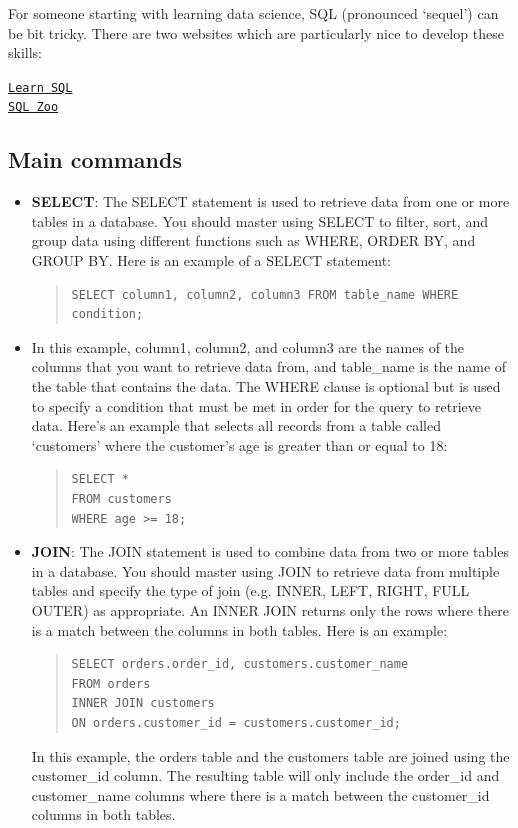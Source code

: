 \documentclass[11pt]{article}
\begin{document}
For someone starting with learning data science, SQL (pronounced `sequel') can be bit tricky. 
There are two websites which are particularly nice to develop these skills:

\href{https://learnsql.com/blog}{\texttt{Learn SQL}}  \\ 
\href{https://sqlzoo.net/wiki/SQL_Tutorial}{\texttt{SQL Zoo}} 

% 


\subsection{Main commands} 

\begin{itemize}
\item \textbf{SELECT}: The SELECT statement is used to retrieve data from one or more tables in a database. You should master using SELECT to filter, sort, and group data using different functions such as WHERE, ORDER BY, and GROUP BY. Here is an example of a SELECT statement:
\begin{quote}
\begin{verbatim}
SELECT column1, column2, column3 FROM table_name WHERE condition; 
\end{verbatim}
\end{quote}
\item In this example, column1, column2, and column3 are the names of the columns that you want to retrieve data from, and table\_name is the name of the table that contains the data. The WHERE clause is optional but is used to specify a condition that must be met in order for the query to retrieve data. Here’s an example that selects all records from a table called `customers' where the customer’s age is greater than or equal to 18:
\begin{quote}
\begin{verbatim}
SELECT * 
FROM customers
WHERE age >= 18;
\end{verbatim}
\end{quote}


\item \textbf{JOIN}: The JOIN statement is used to combine data from two or more tables in a database. You should master using JOIN to retrieve data from multiple tables and specify the type of join (e.g. INNER, LEFT, RIGHT, FULL OUTER) as appropriate.
An INNER JOIN returns only the rows where there is a match between the columns in both tables. Here is an example:
\begin{quote}
\begin{verbatim}
SELECT orders.order_id, customers.customer_name
FROM orders
INNER JOIN customers
ON orders.customer_id = customers.customer_id;
\end{verbatim}
\end{quote}
In this example, the orders table and the customers table are joined using the customer\_id column. The resulting table will only include the order\_id and customer\_name columns where there is a match between the customer\_id columns in both tables.


\end{itemize}
\end{document}
